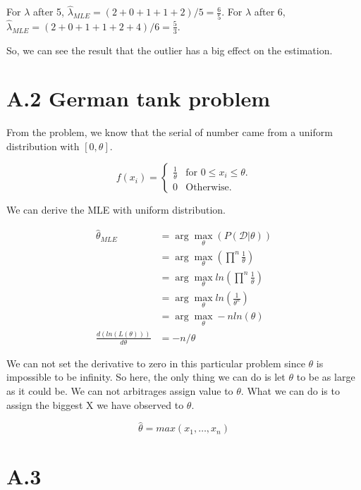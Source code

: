 \documentclass{article}
\begin{document}
For $\lambda $ after 5, $\hat{\lambda}_{MLE} = (2+0+1+1+2)/5 = \frac{6}{5}$. \newline
For $\lambda$ after 6, $\hat{\lambda}_{MLE} = (2+0+1+1+2+4)/6 = \frac{5}{3}$. \newline

So, we can see the result that the outlier has a big effect on the estimation.



\section*{A.2 German tank problem}
From the problem, we know that the serial of number came from a uniform distribution with $[0,\theta]$.

\[ 
f(x_i) = \begin{cases}
\frac{1}{\theta}  & \text{for $0\le x_i \le \theta$.}  \\
0 & \text{Otherwise.}
\end{cases}
\]

We can derive the MLE with uniform distribution.

\begin{subequations}
\begin{align*}
\hat{\theta}_{MLE} & = \arg\max_{\theta} (P(\mathcal{D}|\theta))                   \\
& =  \arg\max_{\theta} (\prod^{n} \frac{1}{\theta}) \\
& = \arg\max_{\theta} ln(\prod^{n} \frac{1}{\theta}) \\
& = \arg\max_{\theta} ln( \frac{1}{\theta^n}) \\
& = \arg\max_{\theta} -n ln(\theta) \\
\frac{d(ln(L(\theta)))}{d\theta} & = -n/\theta
\end{align*}
\end{subequations}

We can not set the derivative to zero in this particular problem since $\theta$ is impossible to be infinity. So here, the only thing we can do is let $\theta$ to be as large as it could be. We can not arbitrages assign value to $\theta$. What we can do is to assign the biggest X we have observed to $\theta$.  \newline

\[\hat{\theta} = max(x_1, \dots, x_n)\]



\section*{A.3}
\end{document}
